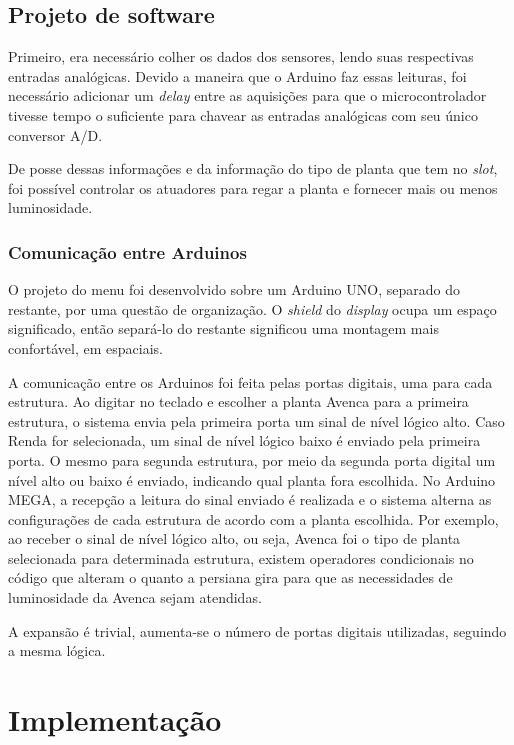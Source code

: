 \documentclass[a4paper,12pt]{report}
\begin{document}
	\section{Projeto de software}
	Primeiro, era necessário colher os dados dos sensores, lendo suas respectivas entradas analógicas. Devido a maneira que o Arduino faz essas leituras, foi necessário adicionar um \textit{delay} entre as aquisições para que o microcontrolador tivesse tempo o suficiente para chavear as entradas analógicas com seu único conversor A/D.
	
	De posse dessas informações e da informação do tipo de planta que tem no \textit{slot}, foi possível controlar os atuadores para regar a planta e fornecer mais ou menos luminosidade.
	
	\subsection{Comunicação entre Arduinos}
	\label{sec:comunicaoArduinos}
	O projeto do menu foi desenvolvido sobre um Arduino UNO, separado do restante, por uma questão de organização. O \textit{shield} do \textit{display} ocupa um espaço significado, então separá-lo do restante significou uma montagem mais confortável, em espaciais. 
	
	A comunicação entre os Arduinos foi feita pelas portas digitais, uma para cada estrutura. Ao digitar no teclado e escolher a planta Avenca para a primeira estrutura, o sistema envia pela primeira porta um sinal de nível lógico alto. Caso Renda for selecionada, um sinal de nível lógico baixo é enviado pela primeira porta. O mesmo para segunda estrutura, por meio da segunda porta digital um nível alto ou baixo é enviado, indicando qual planta fora escolhida. 
	No Arduino MEGA, a recepção a leitura do sinal enviado é realizada e o sistema alterna as configurações de cada estrutura de acordo com a planta escolhida. Por exemplo, ao receber o sinal de nível lógico alto, ou seja, Avenca foi o tipo de planta selecionada para determinada estrutura, existem operadores condicionais no código que alteram o quanto a persiana gira para que as necessidades de luminosidade da Avenca sejam atendidas. 
	
	A expansão é trivial, aumenta-se o número de portas digitais utilizadas, seguindo a mesma lógica.
		
\chapter{Implementação}
	\label{cap:Implementacao}
\end{document}
